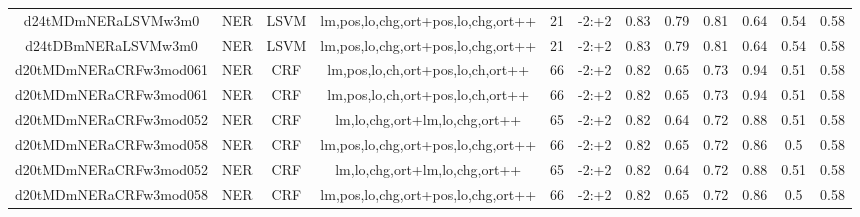 \documentclass[a4paper]{article}
\begin{document}
\begin{landscape}
\begin{center}
\begin{tabular}{ |c|c|c|c|c|c|c|c|c|c|c|c|}
 	
 
 	
 		
 		\small{ d24tMDmNERaLSVMw3m0 } & NER & LSVM & lm,pos,lo,chg,ort+pos,lo,chg,ort++  &  21 &  -2:+2  &  0.83 & 0.79 & 0.81  &  0.64 & 0.54 & 0.58 \\
 		

 	
 
 	
 		
 		\small{ d24tDBmNERaLSVMw3m0 } & NER & LSVM & lm,pos,lo,chg,ort+pos,lo,chg,ort++  &  21 &  -2:+2  &  0.83 & 0.79 & 0.81  &  0.64 & 0.54 & 0.58 \\
 		

 	
 
 	
 		
 		\small{ d20tMDmNERaCRFw3mod061 } & NER & CRF & lm,pos,lo,ch,ort+pos,lo,ch,ort++  &  66 &  -2:+2  &  0.82 & 0.65 & 0.73  &  0.94 & 0.51 & 0.58 \\
 		

 	
 
 	
 		
 		\small{ d20tMDmNERaCRFw3mod061 } & NER & CRF & lm,pos,lo,ch,ort+pos,lo,ch,ort++  &  66 &  -2:+2  &  0.82 & 0.65 & 0.73  &  0.94 & 0.51 & 0.58 \\
 		

 	
 
 	
 		
 		\small{ d20tMDmNERaCRFw3mod052 } & NER & CRF & lm,lo,chg,ort+lm,lo,chg,ort++  &  65 &  -2:+2  &  0.82 & 0.64 & 0.72  &  0.88 & 0.51 & 0.58 \\
 		

 	
 
 	
 		
 		\small{ d20tMDmNERaCRFw3mod058 } & NER & CRF & lm,pos,lo,chg,ort+pos,lo,chg,ort++  &  66 &  -2:+2  &  0.82 & 0.65 & 0.72  &  0.86 & 0.5 & 0.58 \\
 		

 	
 
 	
 		
 		\small{ d20tMDmNERaCRFw3mod052 } & NER & CRF & lm,lo,chg,ort+lm,lo,chg,ort++  &  65 &  -2:+2  &  0.82 & 0.64 & 0.72  &  0.88 & 0.51 & 0.58 \\
 		

 	
 
 	
 		
 		\small{ d20tMDmNERaCRFw3mod058 } & NER & CRF & lm,pos,lo,chg,ort+pos,lo,chg,ort++  &  66 &  -2:+2  &  0.82 & 0.65 & 0.72  &  0.86 & 0.5 & 0.58 \\
 		

 	
 

\end{tabular}
\end{center}
\end{landscape}
\end{document}
